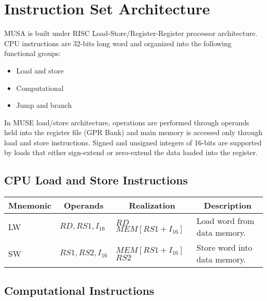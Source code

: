\documentclass{article}
\begin{document}
  
  \newpage
  \section{Instruction Set Architecture}
  \label{sec:isa}
  MUSA is built under RISC Load-Store/Register-Register processor architecture. CPU instructions are 32-bits long word and organized into the following functional groups:
  
  \begin{itemize}
   \item Load and store
   \item Computational
   \item Jump and branch
  \end{itemize}
  
  In MUSE load/store architecture, operations are performed through operands held into the register file (GPR Bank) and main memory is accessed only through load and store instructions. Signed and unsigned integers of 16-bits are supported by loads that either sign-extend or zero-extend the data loaded into the register.  
  
  \subsection{CPU Load and Store Instructions}
  
 \FloatBarrier
  \begin{table}[H]
    \begin{center}
      \label{tab:load_store_instructions}
      \begin{tabular}[pos]{| l | l | l | l |} \hline 	
      \multicolumn{1}{|c|}{\cellcolor[gray]{0.9}\textbf{Mnemonic}} &
      \multicolumn{1}{c|}{\cellcolor[gray]{0.9}\textbf{Operands}} &  
      \multicolumn{1}{c|}{\cellcolor[gray]{0.9}\textbf{Realization}} &
      \multicolumn{1}{c|}{\cellcolor[gray]{0.9}\textbf{Description}} \\ \hline
	LW  & $RD,RS1,I_{16}$ & $RD$ \textleftarrow $MEM[RS1+I_{16}]$ & Load word from data memory.	\\ \hline
	SW  & $RS1,RS2,I_{16}$ & $MEM[RS1+I_{16}]$ \textleftarrow $RS2$ & Store word into data memory. 		\\ \hline
      \end{tabular}
    \end{center}
  \end{table}  
  
  
  \subsection{Computational Instructions}
  
\end{document}
